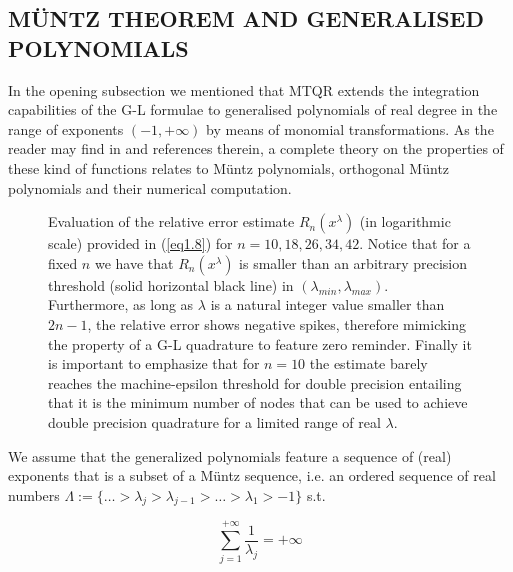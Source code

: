 \documentclass[a4paper, twosided]{book}
\begin{document}
\subsection[Müntz theorem and generalised polynomials]{\changefont MÜNTZ THEOREM AND GENERALISED POLYNOMIALS }\label{SubSec1.2.4}

In the opening subsection we mentioned that MTQR extends the integration capabilities of the G-L formulae to generalised polynomials of real degree in the range of exponents $(-1,+\infty)$ by means of monomial transformations. As the reader may find in \cite{Lombardi09} and references therein, a complete theory on the properties of these kind of functions relates to Müntz polynomials, orthogonal Müntz polynomials and their numerical computation. 

\newpage
\begin{center}
        \begin{figure}[t]
        \captionsetup{singlelinecheck=off}
        
        \caption{Evaluation of the relative error estimate $R_n(x^{\lambda})$ (in logarithmic scale) provided in (\ref{eq1.8}) for $n=10,18,26,34,42$. Notice that for a fixed $n$ we have that $R_n(x^{\lambda})$ is smaller than an arbitrary precision threshold (solid horizontal black line) in $(\lambda_{min},\lambda_{max})$. Furthermore, as long as $\lambda$ is a natural integer value smaller than $2n-1$, the relative error shows negative spikes, therefore mimicking the property of a G-L quadrature to feature zero reminder. Finally it is important to emphasize that for $n=10$ the estimate barely reaches the machine-epsilon threshold for double precision entailing that it is the minimum number of nodes that can be used to achieve double precision quadrature for a limited range of real $\lambda$.}
        \label{Fig1.1}
        \end{figure}
\end{center}

\noindent
We assume that the generalized polynomials feature a sequence of (real) exponents that is a subset of a Müntz sequence, i.e. an ordered sequence of real numbers $\Lambda:=\{\dots>\lambda_j>\lambda_{j-1}>\dots>\lambda_1>-1\}$ s.t.

\begin{equation}\label{eq1.10}
    \sum_{j=1}^{+\infty}\frac{1}{\lambda_j}=+\infty
\end{equation}
\end{document}
